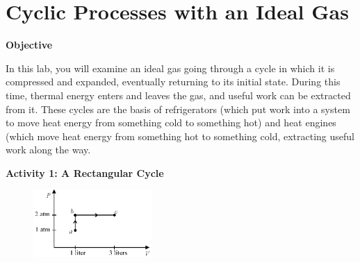 \section{Cyclic Processes with an Ideal Gas}

\makelabheader %

\vspace{0.1in}
\textbf{Objective} 

In this lab, you will examine an ideal gas going through a cycle in which it is compressed and expanded, eventually returning to its initial state.  During this time, thermal energy enters and leaves the gas, and useful work can be extracted from it.  These cycles are the basis of refrigerators (which put work into a system to move heat energy from something cold to something hot) and heat engines (which move heat energy from something hot to something cold, extracting useful work along the way.

\textbf{Activity 1: A Rectangular Cycle}

\begin{figure}
    \vspace{-0.2 in}
    \includegraphics[width=0.4\textwidth]{ideal_gas_cycles/square_cycle1.eps}
\end{figure}

